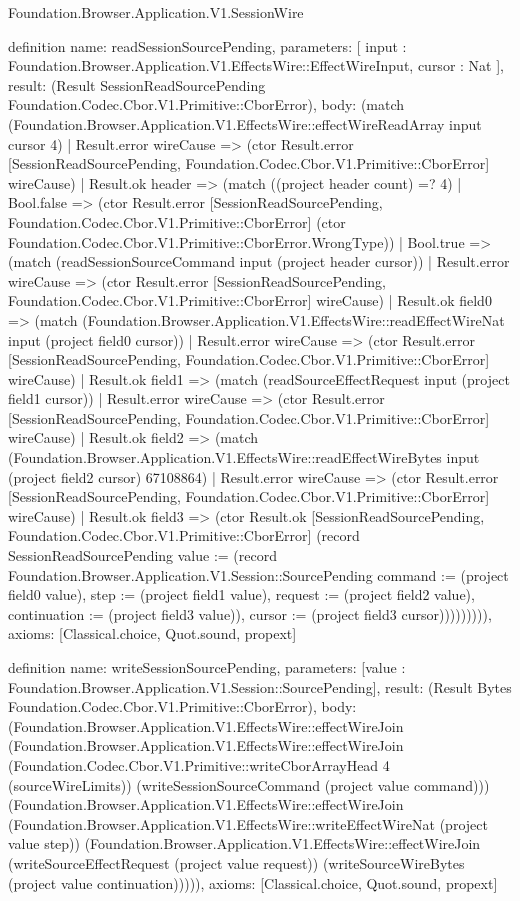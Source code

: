 \begin{lexlean}{Foundation.Browser.Application.V1.SessionWire}
\begin{semanticmodule}
definition{
  name: readSessionSourcePending,
  parameters: [
    input : Foundation.Browser.Application.V1.EffectsWire::EffectWireInput,
    cursor : Nat
  ],
  result: (Result SessionReadSourcePending Foundation.Codec.Cbor.V1.Primitive::CborError),
  body: (match (Foundation.Browser.Application.V1.EffectsWire::effectWireReadArray input cursor 4)
    | Result.error wireCause => (ctor Result.error [SessionReadSourcePending, Foundation.Codec.Cbor.V1.Primitive::CborError] wireCause)
    | Result.ok header => (match ((project header count) =? 4)
      | Bool.false => (ctor Result.error [SessionReadSourcePending, Foundation.Codec.Cbor.V1.Primitive::CborError] (ctor Foundation.Codec.Cbor.V1.Primitive::CborError.WrongType))
      | Bool.true => (match (readSessionSourceCommand input (project header cursor))
        | Result.error wireCause => (ctor Result.error [SessionReadSourcePending, Foundation.Codec.Cbor.V1.Primitive::CborError] wireCause)
        | Result.ok field0 => (match (Foundation.Browser.Application.V1.EffectsWire::readEffectWireNat input (project field0 cursor))
          | Result.error wireCause => (ctor Result.error [SessionReadSourcePending, Foundation.Codec.Cbor.V1.Primitive::CborError] wireCause)
          | Result.ok field1 => (match (readSourceEffectRequest input (project field1 cursor))
            | Result.error wireCause => (ctor Result.error [SessionReadSourcePending, Foundation.Codec.Cbor.V1.Primitive::CborError] wireCause)
            | Result.ok field2 => (match (Foundation.Browser.Application.V1.EffectsWire::readEffectWireBytes input (project field2 cursor) 67108864)
              | Result.error wireCause => (ctor Result.error [SessionReadSourcePending, Foundation.Codec.Cbor.V1.Primitive::CborError] wireCause)
              | Result.ok field3 => (ctor Result.ok [SessionReadSourcePending, Foundation.Codec.Cbor.V1.Primitive::CborError] (record SessionReadSourcePending {value := (record Foundation.Browser.Application.V1.Session::SourcePending {command := (project field0 value), step := (project field1 value), request := (project field2 value), continuation := (project field3 value)}), cursor := (project field3 cursor)})))))))),
  axioms: [Classical.choice, Quot.sound, propext]
}

definition{
  name: writeSessionSourcePending,
  parameters: [value : Foundation.Browser.Application.V1.Session::SourcePending],
  result: (Result Bytes Foundation.Codec.Cbor.V1.Primitive::CborError),
  body: (Foundation.Browser.Application.V1.EffectsWire::effectWireJoin (Foundation.Browser.Application.V1.EffectsWire::effectWireJoin (Foundation.Codec.Cbor.V1.Primitive::writeCborArrayHead 4 (sourceWireLimits)) (writeSessionSourceCommand (project value command))) (Foundation.Browser.Application.V1.EffectsWire::effectWireJoin (Foundation.Browser.Application.V1.EffectsWire::writeEffectWireNat (project value step)) (Foundation.Browser.Application.V1.EffectsWire::effectWireJoin (writeSourceEffectRequest (project value request)) (writeSourceWireBytes (project value continuation))))),
  axioms: [Classical.choice, Quot.sound, propext]
}


\end{semanticmodule}
\end{lexlean}
